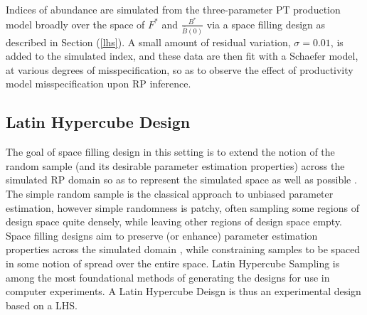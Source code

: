%
%


%

Indices of abundance are simulated from the three-parameter PT production model
broadly over the space of $F^*$ and $\frac{B^*}{\bar B(0)}$ via a space filling
design as described in Section (\ref{lhs}). A small amount of residual variation,
$\sigma=0.01$, is added to the simulated index, and these data are then fit with a
Schaefer model, at various degrees of misspecification, so as to observe the
effect of productivity model misspecification upon RP inference.

%
%
%
\subsection{Latin Hypercube Design \label{lhs}}

%
The goal of space filling design in this setting is to extend the notion of the
random sample (and its desirable parameter estimation properties) across the
simulated RP domain so as to represent the simulated space as well as possible \cite{gramacy_surrogates_2020}.
The simple random sample is the classical approach to unbiased parameter
estimation, however simple randomness is patchy, often sampling some regions
of design space quite densely, while leaving other regions of design space empty.
Space filling designs aim to preserve (or enhance) parameter estimation properties
across the simulated domain \cite{devon_lin_latin_2015, stein_large_1987},
while constraining samples to be spaced in some notion of spread over the entire space.
Latin Hypercube Sampling \cite[LHS]{mckay_comparison_2000} is among the most
foundational methods of generating the designs for use in computer experiments. 
A Latin Hypercube Deisgn \cite[LHD]{santner_design_2003} is thus an experimental 
design based on a LHS. 

